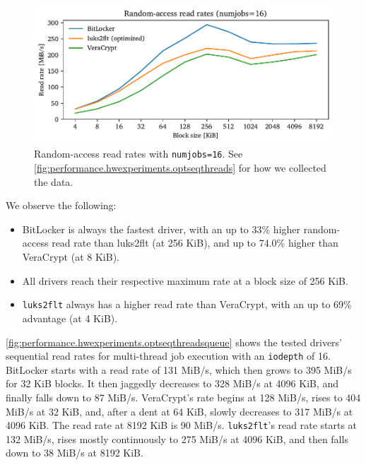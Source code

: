 \begin{figure}[htb!]
	\center
	\includegraphics[scale=1]{../fig/performance.hwexperiments.optrandthreads.pdf}
	\caption[
		Random-access read rates with \texttt{numjobs=16}
	]{
		Random-access read rates with \texttt{numjobs=16}. See \autoref{fig:performance.hwexperiments.optseqthreads} for how we collected the data.
	}
	\label{fig:performance.hwexperiments.optrandthreads}
\end{figure}

We observe the following:
\begin{itemize}[beginpenalty=10000]
	\item BitLocker is always the fastest driver, with an up to 33\% higher random-access read rate than luks2flt (at 256 KiB), and up to 74.0\% higher than VeraCrypt (at 8 KiB).
	\item All drivers reach their respective maximum rate at a block size of 256 KiB.
	\item \texttt{luks2flt} always has a higher read rate than VeraCrypt, with an up to 69\% advantage (at 4 KiB).
\end{itemize}

\autoref{fig:performance.hwexperiments.optseqthreadsqueue} shows the tested drivers' sequential read rates for multi-thread job execution with an \texttt{iodepth} of 16. BitLocker starts with a read rate of 131 MiB/s, which then grows to 395 MiB/s for 32 KiB blocks. It then jaggedly decreases to 328 MiB/s at 4096 KiB, and finally falls down to 87 MiB/s. VeraCrypt's rate begins at 128 MiB/s, rises to 404 MiB/s at 32 KiB, and, after a dent at 64 KiB, slowly decreases to 317 MiB/s at 4096 KiB. The read rate at 8192 KiB is 90 MiB/s. \texttt{luks2flt}'s read rate starts at 132 MiB/s, rises mostly continuously to 275 MiB/s at 4096 KiB, and then falls down to 38 MiB/s at 8192 KiB.

